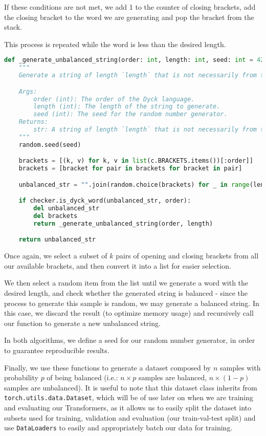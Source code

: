 If these conditions are not met, we add 1 to the counter of closing brackets, add the closing bracket to the word we are generating and pop the bracket from the stack.

This process is repeated while the word is less than the desired length.

\begin{lstlisting}[language=Python, caption=Generate unbalanced string, label=code:unbalanced_generator]
def _generate_unbalanced_string(order: int, length: int, seed: int = 42) -> str:
    """
    Generate a string of length `length` that is not necessarily from the Dyck language of order `order`.

    Args:
        order (int): The order of the Dyck language.
        length (int): The length of the string to generate.
        seed (int): The seed for the random number generator.
    Returns:
        str: A string of length `length` that is not necessarily from the Dyck language of order `order`.
    """
    random.seed(seed)

    brackets = [(k, v) for k, v in list(c.BRACKETS.items())[:order]]
    brackets = [bracket for pair in brackets for bracket in pair]

    unbalanced_str = "".join(random.choice(brackets) for _ in range(length))

    if checker.is_dyck_word(unbalanced_str, order):
        del unbalanced_str
        del brackets
        return _generate_unbalanced_string(order, length)

    return unbalanced_str
\end{lstlisting}

Once again, we select a subset of $k$ pairs of opening and closing brackets from all our available brackets, and then convert it into a list for easier selection.

We then select a random item from the list until we generate a word with the desired length, and check whether the generated string is balanced - since the process to generate this sample is random, we may generate a balanced string. In this case, we discard the result (to optimize memory usage) and recursively call our function to generate a new unbalanced string.

In both algorithms, we define a seed for our random number generator, in order to guarantee reproducible results.

Finally, we use these functions to generate a dataset composed by $n$ samples with probability $p$ of being balanced (i.e.: $n\times p$ samples are balanced, $n \times (1-p)$ samples are unbalanced). It is useful to note that this dataset class inherits from \verb|torch.utils.data.Dataset|, which will be of use later on when we are training and evaluating our Transformers, as it allows us to easily split the dataset into subsets used for training, validation and evaluation (our train-val-test split) and use \verb|DataLoaders| to easily and appropriately batch our data for training.

